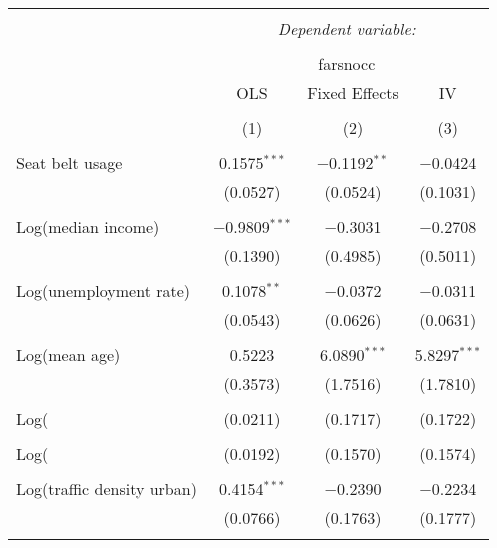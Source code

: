 
\begin{table}[!htbp] \centering 
  \caption{} 
  \label{} 
\begin{tabular}{@{\extracolsep{5pt}}lccc} 
\\[-1.8ex]\hline 
\hline \\[-1.8ex] 
 & \multicolumn{3}{c}{\textit{Dependent variable:}} \\ 
\cline{2-4} 
\\[-1.8ex] & \multicolumn{3}{c}{farsnocc} \\ 
 & OLS & Fixed Effects & IV \\ 
\\[-1.8ex] & (1) & (2) & (3)\\ 
\hline \\[-1.8ex] 
 Seat belt usage & 0.1575$^{***}$ & $-$0.1192$^{**}$ & $-$0.0424 \\ 
  & (0.0527) & (0.0524) & (0.1031) \\ 
  & & & \\ 
 Log(median income) & $-$0.9809$^{***}$ & $-$0.3031 & $-$0.2708 \\ 
  & (0.1390) & (0.4985) & (0.5011) \\ 
  & & & \\ 
 Log(unemployment rate) & 0.1078$^{**}$ & $-$0.0372 & $-$0.0311 \\ 
  & (0.0543) & (0.0626) & (0.0631) \\ 
  & & & \\ 
 Log(mean age) & 0.5223 & 6.0890$^{***}$ & 5.8297$^{***}$ \\ 
  & (0.3573) & (1.7516) & (1.7810) \\ 
  & & & \\ 
 Log(%
  & (0.0211) & (0.1717) & (0.1722) \\ 
  & & & \\ 
 Log(%
  & (0.0192) & (0.1570) & (0.1574) \\ 
  & & & \\ 
 Log(traffic density urban) & 0.4154$^{***}$ & $-$0.2390 & $-$0.2234 \\ 
  & (0.0766) & (0.1763) & (0.1777) \\ 
  & & & \\ 

\end{tabular}
\end{table}
